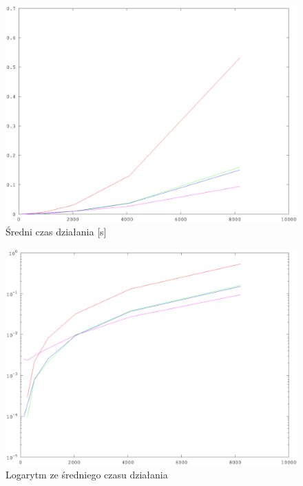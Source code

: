 \documentclass[11pt,a4paper]{article}
\begin{document}
\begin{figure}[h!]
\begin{center}
	\includegraphics[scale=0.45]{float_time}
	\caption{Średni czas działania [s]}
	\label{fig:float_time}
\end{center}
\end{figure}

\begin{figure}[h!]
\begin{center}
	\includegraphics[scale=0.45]{float_time_log}
	\caption{Logarytm ze średniego czasu działania}
	\label{fig:float_time_log}
\end{center}
\end{figure}

\newpage
\end{document}
